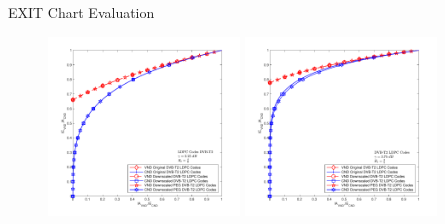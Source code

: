 \documentclass[11pt, aspectratio=169]{beamer}
\begin{document}
\begin{frame}{EXIT Chart Evaluation}
	\vspace{-0.75cm}
	\begin{figure}
		\centering
			\hspace{ -0.5in}
		\begin{minipage}{.5\linewidth}
			\hspace{1cm}
			\includegraphics[width=2in]{gambarafa/exit/12/12semua=snr2,25Ich=0,6613.pdf}
			\vspace{-0.5cm}
			
		\end{minipage}
		\hfill 	
		\hspace{ -2in}
		\begin{minipage}{.5\linewidth}
			\hspace{2cm}
			\includegraphics[width=2in]{gambarafa/exit/35/35semua=snr3,75Ich=0,7786.pdf}
			

\end{minipage}
\end{figure}
\end{frame}
\end{document}
